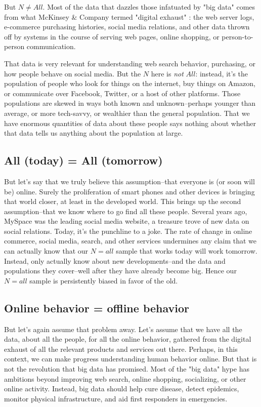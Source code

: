 \documentclass[12pt]{article}
\begin{document}
But $N\neq All$. Most of the data that dazzles those infatuated by
"big data" comes from what McKinsey \& Company termed "digital
exhaust" \citep{mckinsey2011}: the web server logs, e-commerce
purchasing histories, social media relations, and other data thrown
off by systems in the course of serving web pages, online shopping,
or person-to-person communication. 

That data is very relevant for understanding web search behavior,
purchasing, or how people behave on social media. But the $N$ here is
\textit{not} $All$: instead, it's the population of people who look
for things on the internet, buy things on Amazon, or communicate over
Facebook, Twitter, or a host of other platforms. Those populations are
skewed in ways both known and unknown--perhaps younger than average,
or more tech-savvy, or wealthier than the general population. That we
have enormous quantities of data about these people says nothing about
whether that data tells us anything about the population at large.



\subsection{All (today) = All (tomorrow)}
\label{sec:all-today-tomorrow}

But let's say that we truly believe this assumption--that everyone is
(or soon will be) online. Surely the proliferation of smart phones and
other devices is bringing that world closer, at least in the developed
world. This brings up the second assumption--that we know where to go
find all these people. Several years ago, MySpace was the leading
social media website, a treasure trove of new data on social
relations. Today, it's the punchline to a joke. The rate of change in
online commerce, social media, search, and other services undermines
any claim that we can actually know that our $N=all$ sample that works
today will work tomorrow. Instead, only actually know about new
developments--and the data and populations they cover--well after they
have already become big. Hence our $N=all$ sample is persistently
biased in favor of the old.


\subsection{Online behavior = offline behavior}
\label{sec:online-offline}

But let's again assume that problem away. Let's assume that we have
all the data, about all the people, for all the online behavior,
gathered from the digital exhaust of all the relevant products and
services out there. Perhaps, in this context, we can make progress
understanding human behavior online. But that is not the revolution
that big data has promised. Most of the "big data" hype has ambitions
beyond improving web search, online shopping, socializing, or other
online activity. Instead, big data should help cure disease, detect
epidemics, monitor physical infrastructure, and aid first responders
in emergencies. 
\end{document}
